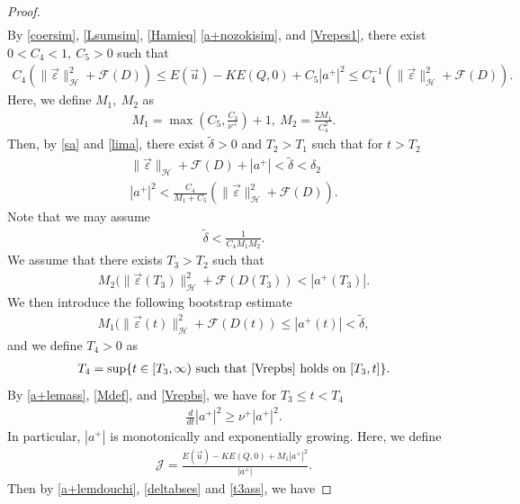 \documentclass[reqno]{amsart}
\theoremstyle{plain}
\theoremstyle{definition}
\numberwithin{equation}{section}
\newcommand{\1}{\mathbbm{1}}
\begin{document}
\begin{proof}
\begin{align}
\end{align}
By \eqref{coersim}, \eqref{Lsumsim}, \eqref{Hamieq} \eqref{a+nozokisim}, and \eqref{Vrepes1}, there exist $0<C_4<1,\ C_5>0$ such that
\begin{align}\label{a+lemdouchi}
C_4(\|\vec{\varepsilon}\|_{\mathcal{H}}^2+\mathcal{F}(D))\leq E(\vec{u})-KE(Q,0)+C_5|a^+|^2\leq C_4^{-1}(\|\vec{\varepsilon}\|_{\mathcal{H}}^2+\mathcal{F}(D)).
\end{align}
Here, we define $M_1,\ M_2$ as
\begin{align}\label{Mdef}
M_1=\max{\left(C_5,\frac{C_3}{\nu^+} \right)}+1,\ M_2=\frac{2M_1}{C_4^2}.
\end{align}
Then, by \eqref{sa} and \eqref{lima}, there exist $\tilde{\delta}>0$ and  $T_2>T_1$ such that for $t>T_2$
\begin{align}
\|\vec{\varepsilon}\|_{\mathcal{H}}+\mathcal{F}(D)+|a^+|<\tilde{\delta}<\delta_2 \label{repasses1}
\\
|a^+|^2<\frac{C_4}{M_1+C_5}(\|\vec{\varepsilon}\|_{\mathcal{H}}^2+\mathcal{F}(D)). \label{repasses2}
\end{align}
Note that we may assume 
\begin{align}\label{deltabses}
\tilde{\delta}<\frac{1}{C_4M_1M_2}.
\end{align}
We assume that there exists $T_3>T_2$ such that 
\begin{align}\label{t3ass}
M_2(\|\vec{\varepsilon}(T_3)\|_{\mathcal{H}}^2+\mathcal{F}(D(T_3))<|a^+(T_3)|.
\end{align}
We then introduce the following bootstrap estimate
\begin{align}\label{Vrepbs}
M_1(\|\vec{\varepsilon}(t)\|_{\mathcal{H}}^2+\mathcal{F}(D(t))\leq |a^+(t)|<\tilde{\delta},
\end{align}
and we define $T_4>0$ as
\begin{align*}
T_4=\sup\{ t\in[T_3,\infty)\ \mbox{such that \eqref{Vrepbs} holds on}\ [T_3,t]\}.
\end{align*}
By \eqref{a+lemass}, \eqref{Mdef}, and  \eqref{Vrepbs}, we have for $T_3\leq t<T_4$
\begin{align*}
\frac{d}{dt}|a^+|^2\geq \nu^+|a^+|^2.
\end{align*}
In particular, $|a^+|$ is monotonically and exponentially growing. Here, we define 
\begin{align*}
\mathcal{J}=\frac{E(\vec{u})-KE(Q,0)+M_1|a^+|^2}{|a^+|}.
\end{align*}
Then by \eqref{a+lemdouchi}, \eqref{deltabses} and \eqref{t3ass}, we have

\end{proof}
\end{document}
